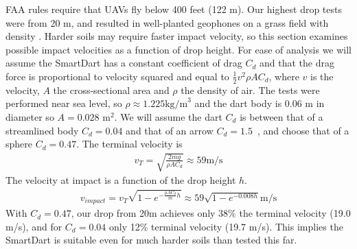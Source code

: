 FAA rules require that UAVs fly below 400 feet (122 m). Our highest drop tests were from 20 m, and resulted in well-planted geophones on a grass field with density . Harder soils may require faster impact velocity, so this section examines possible impact velocities as a function of drop height.
For ease of analysis we will assume the SmartDart has a constant coefficient of drag $C_d$ and that the drag force is proportional to velocity squared and equal to $\frac{1}{2} v^2 \rho A C_d$, where $v$ is the velocity, $A$ the cross-sectional area and $\rho$ the density of air.  The tests were performed near sea level, so $\rho \approx 1.225  \text{kg/m}^3$ and the dart body is 0.06 m in diameter so $A=0.028$ m$^2$.  We will assume the dart $C_d$ is between that of a streamlined body $C_d=0.04$ and that of an arrow $C_d=1.5$~\cite{miyazaki2013aerodynamic}, and choose that of a sphere $C_d=0.47$.
The terminal velocity is 
\begin{align}
v_T = \sqrt{\frac{2 m g}{\rho A  C_d}} \approx 59 \text{m/s}
\end{align}
The velocity at impact is a function of the drop height $h$.
\begin{align}
v_{impact} = v_T  \sqrt{ 1 - e^{ -\frac{\rho A  C_d}{m} h }} \approx 59\sqrt{ 1 - e^{ -0.008 h }} \text{m/s}
\end{align}
With  $C_d=0.47$, our drop from 20m achieves only 38\% the terminal velocity (19.0 m/s), and for $C_d=0.04$ only 12\% terminal velocity  (19.7 m/s).
This implies the SmartDart is suitable even for much harder soils than tested this far.

